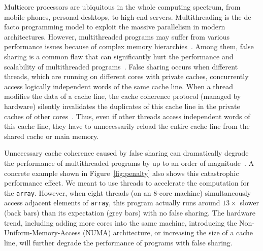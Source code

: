 Multicore processors are ubiquitous in the whole computing spectrum, from mobile phones, personal desktops, to high-end servers. Multithreading is the de-facto programming model to exploit the massive parallelism in modern architectures.
However, multithreaded programs may suffer from various performance issues because of complex memory hierarchies~\cite{ibs-sc,ibs-sc2,Dramon}. Among them, false sharing is a common flaw that can significantly hurt the performance and scalability of multithreaded programs~\cite{falseshare:effect}. False sharing occurs when different threads, which are running on different cores with private caches, concurrently access logically independent words of the same cache line. When a thread modifies the data of a cache line, the cache coherence protocol (managed by hardware) silently invalidates the duplicates of this cache line in the private caches of other cores~\cite{MESI}. Thus, even if other threads access independent words of this cache line, they have to unnecessarily reload the entire cache line from the shared cache or main memory. 

Unnecessary cache coherence caused by false sharing can dramatically degrade the performance of multithreaded programs by up to an order of magnitude~\cite{falseshare:effect}. A concrete example shown in Figure~\ref{fig:penalty} also shows this catastrophic performance effect. We meant to use threads to accelerate the computation for the {\tt array}. However, when eight threads (on an 8-core machine) simultaneously access adjacent elements of {\tt array}, this program actually runs around $13\times$ slower (back bars) than its expectation (grey bars) with no false sharing.
The hardware trend, including adding more cores into the same machine, introducing the Non-Uniform-Memory-Access (NUMA) architecture, or increasing the size of a cache line, will further degrade the performance of programs with false sharing.

